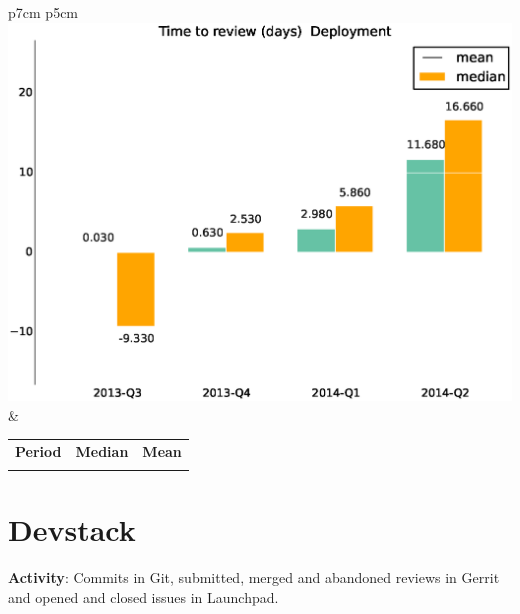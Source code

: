 \documentclass[a4wide,11pt]{report}
\begin{document}
\begin{tabular}{p{7cm} p{5cm}}
    \vspace{0pt} 
    \includegraphics[scale=.35]{figs/timetoreview_medianDeployment.eps}
    & 
    \vspace{0pt}
    \begin{tabular}{l|r|r|}%
    \bfseries Period & \bfseries Median & \bfseries Mean %
    \csvreader[head to column names]{data/timetoreview_medianDeployment.csv}{}%
    {\\ & \mediantime & \meantime}
    \end{tabular}
\end{tabular}

\newpage
\section{Devstack}

\textbf{Activity}: Commits in Git, submitted, merged and abandoned reviews in Gerrit and opened and closed issues in Launchpad.
\end{document}
